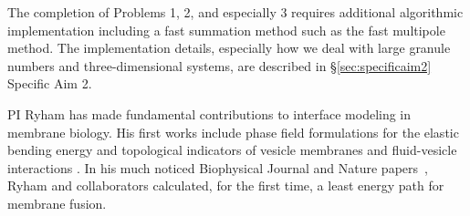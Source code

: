 The completion of Problems 1, 2, and especially 3 
requires additional algorithmic implementation including a
fast summation method such as the fast multipole method.
The implementation details, especially how we deal with large
granule numbers and three-dimensional systems, are
described in \S \ref{sec:specificaim2} Specific Aim 2.

PI Ryham has made fundamental contributions to interface modeling in
membrane biology.  His first works include
phase field formulations for the elastic bending energy \cite{0951-7715-18-3-016,Du05} and topological indicators \cite{DuEuler} of vesicle membranes
and fluid-vesicle interactions \cite{QiangDu09}.
In his much noticed Biophysical Journal
and Nature papers~\cite{RyKlYaCo16,Chetal16}, Ryham and collaborators 
calculated, for the first time, a least energy path for membrane fusion.  





